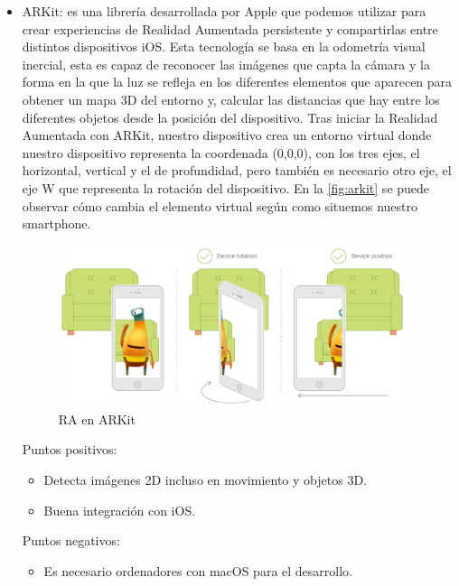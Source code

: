 \begin{itemize}
    \item ARKit\cite{arkit}: es una librería desarrollada por Apple que
    podemos utilizar para crear experiencias de Realidad Aumentada persistente y
    compartirlas entre distintos dispositivos iOS. 
    Esta tecnología se basa en la odometría visual inercial,
    esta es capaz de reconocer las imágenes que capta la cámara y la forma en
    la que la luz se refleja en los diferentes elementos que aparecen para
    obtener un mapa 3D del entorno y, calcular las distancias que hay entre los
    diferentes objetos desde la posición del dispositivo.
    Tras iniciar la Realidad Aumentada con ARKit,
    nuestro dispositivo crea un entorno virtual donde nuestro
    dispositivo representa la coordenada (0,0,0), con los tres ejes,
    el horizontal, vertical y el de profundidad, pero también es necesario
    otro eje, el eje W que representa la rotación del dispositivo. En la
    \autoref{fig:arkit} se puede observar cómo cambia el elemento virtual según como
    situemos nuestro smartphone.

    \begin{figure}[H]
        \centering
        \includegraphics[width=4in]{figures/chapter-2/arkit.png}
        \caption{RA en ARKit\cite{arkitimage}}
        \label{fig:arkit}
    \end{figure}

    Puntos positivos:
    \begin{itemize}
        \item Detecta imágenes 2D incluso en movimiento y objetos 3D.
        \item Buena integración con iOS.
    \end{itemize}
    Puntos negativos:
    \begin{itemize}
        \item Es necesario ordenadores con macOS para el desarrollo.
    \end{itemize}



\end{itemize}
